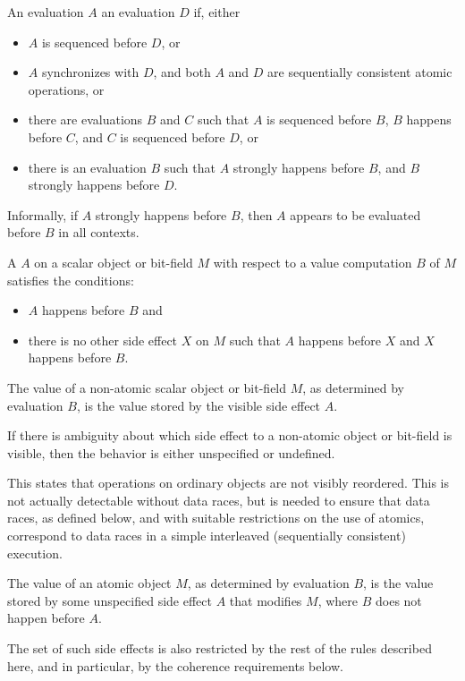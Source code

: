 \pnum
An evaluation $A$ 
an evaluation $D$ if, either
\begin{itemize}
\item $A$ is sequenced before $D$, or
\item $A$ synchronizes with $D$, and
both $A$ and $D$ are
sequentially consistent atomic operations, or
\item there are evaluations $B$ and $C$
such that $A$ is sequenced before $B$,
$B$ happens before $C$, and
$C$ is sequenced before $D$, or
\item there is an evaluation $B$ such that
$A$ strongly happens before $B$, and
$B$ strongly happens before $D$.
\end{itemize}
\begin{note}
Informally, if $A$ strongly happens before $B$,
then $A$ appears to be evaluated before $B$
in all contexts.
\end{note}

\pnum
A  $A$ on a scalar object or bit-field $M$
with respect to a value computation $B$ of $M$ satisfies the
conditions:
\begin{itemize}
\item $A$ happens before $B$ and
\item there is no other
%
side effect $X$ on $M$ such that $A$
happens before $X$ and $X$ happens before $B$.
\end{itemize}

The value of a non-atomic scalar object or bit-field $M$, as determined by
evaluation $B$, is the value stored by the
%
visible side effect $A$.
\begin{note}
If there is ambiguity about which side effect to a
non-atomic object or bit-field is visible, then the behavior is either
unspecified or undefined.
\end{note}
\begin{note}
This states that operations on
ordinary objects are not visibly reordered. This is not actually detectable
without data races, but is needed to ensure that data races, as defined
below, and with suitable restrictions on the use of atomics, correspond to data
races in a simple interleaved (sequentially consistent) execution.
\end{note}

\pnum
The value of an
atomic object $M$, as determined by evaluation $B$, is the value
stored by some unspecified
side effect $A$ that modifies $M$, where $B$ does not happen
before $A$.
\begin{note}
The set of such side effects is also restricted by the rest of the rules
described here, and in particular, by the coherence requirements below.
\end{note}


